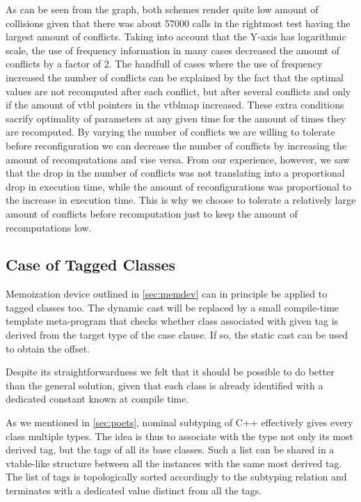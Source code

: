 \documentclass[preprint]{sigplanconf}
\begin{document}
As can be seen from the graph, both schemes render quite low amount of 
collisions given that there was about 57000 calls in the rightmost test having 
the largest amount of conflicts. Taking into account that the Y-axis has 
logarithmic scale, the use of frequency information in many cases decreased the 
amount of conflicts by a factor of 2. The handfull of cases where the use of 
frequency increased the number of conflicts can be explained by the fact that 
the optimal values are not recomputed after each conflict, but after several 
conflicts and only if the amount of vtbl pointers in the vtblmap increased. These 
extra conditions sacrify optimality of parameters at any given time for the amount 
of times they are recomputed. By varying the number of conflicts we are willing 
to tolerate before reconfiguration we can decrease the number of conflicts by 
increasing the amount of recomputations and vise versa. From our experience, 
however, we saw that the drop in the number of conflicts was not translating 
into a proportional drop in execution time, while the amount of reconfigurations 
was proportional to the increase in execution time. This is why we choose to 
tolerate a relatively large amount of conflicts before recomputation just to 
keep the amount of recomputations low.

\subsection{Case of Tagged Classes}
\label{sec:cotc}

Memoization device outlined in \textsection\ref{sec:memdev} can in principle be 
applied to tagged classes too. The dynamic cast will be replaced by a small 
compile-time template meta-program that checks whether class associated with 
given tag is derived from the target type of the case clause. If so, the static 
cast can be used to obtain the offset.

Despite its straightforwardness we felt that it should be possible to do better 
than the general solution, given that each class is already identified with a 
dedicated constant known at compile time.

As we mentioned in \textsection\ref{sec:poets}, nominal subtyping of C++ 
effectively gives every class multiple types. The idea is thus to associate with 
the type not only its most derived tag, but the tags of all its base classes.
Such a list can be shared in a vtable-like structure between all the instances 
with the same most derived tag. The list of tags is topologically sorted 
accordingly to the subtyping relation and terminates with a dedicated value 
distinct from all the tags.
\end{document}
